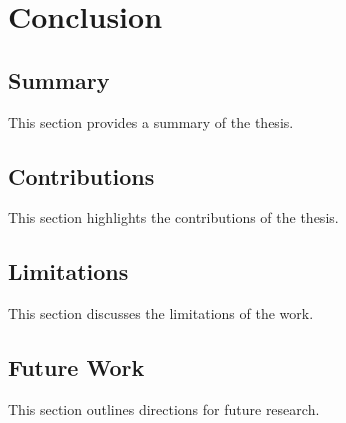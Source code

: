 \chapter{Conclusion}
\label{chap:conclusion}

\section{Summary}
This section provides a summary of the thesis.

\section{Contributions}
This section highlights the contributions of the thesis.

\section{Limitations}
This section discusses the limitations of the work.

\section{Future Work}
This section outlines directions for future research.
